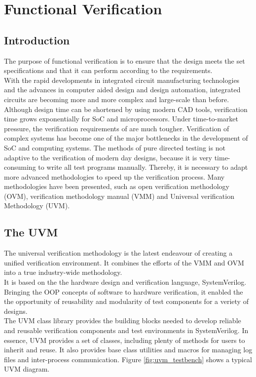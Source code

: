 \documentclass[../main.tex]{subfiles}
\begin{document}
\chapter{Functional Verification}

\section{Introduction}
The purpose of functional verification is to ensure that the design meets the set specifications and that it can perform according to the requirements.\\
\newline
With the rapid developments in integrated circuit manufacturing technologies and the advances in computer aided design and design automation, integrated circuits are becoming more and more complex and large-scale than before. Although design time can be shortened by using modern CAD tools, verification time grows exponentially for SoC and microprocessors. Under time-to-market pressure, the verification requirements of are much tougher. Verification of complex systems has become one of the major bottlenecks in the development of SoC and computing systems. The methods of pure directed testing is not adaptive to the verification of modern day designs, because it is very time-consuming to write all test programs manually. Thereby, it is necessary to adapt more advanced methodologies to speed up the verification process. Many methodologies have been presented, such as open verification methodology (OVM), verification methodology manual (VMM) and Universal verification Methodology (UVM).\cite{Spear}

\section{The UVM}
The universal verification methodology is the latest endeavour of creating a unified verification environment.
It combines the efforts of the VMM and OVM into a true industry-wide methodology. \\
\newline
It is based on the the hardware design and verification language, SystemVerilog. Bringing the OOP concepts of software to hardware verification, it enabled the the opportunity of reusability and modularity of test components for a veriety of designs.\\
The UVM class library provides the building blocks needed to develop reliable and reusable verification components and test environments in SystemVerilog. In essence, UVM provides a set of classes, including plenty of methods for users to inherit and reuse. It also provides base class utilities and macros for managing log files and inter-process communication. Figure \ref{fig:uvm_testbench} shows a typical UVM diagram.
\end{document}
